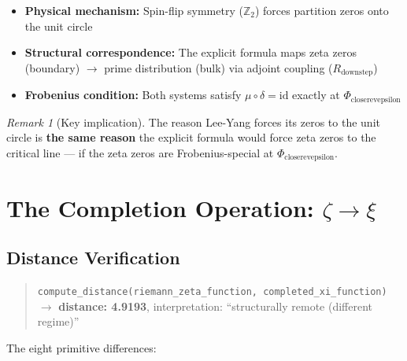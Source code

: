 \documentclass[12pt,oneside]{article}
\theoremstyle{definition}
\theoremstyle{remark}
\newtheorem{remark}[theorem]{Remark}
\newcommand{\Rdownstep}{R_{\text{downstep}}}
\newcommand{\Phicloserevepsilon}{\Phi_{\text{closerevepsilon}}}
\begin{document}
\begin{itemize}
\item \textbf{Physical mechanism:} Spin-flip symmetry ($\mathbb{Z}_2$) forces partition zeros onto the unit circle
\item \textbf{Structural correspondence:} The explicit formula maps zeta zeros (boundary) $\to$ prime distribution (bulk) via adjoint coupling ($\Rdownstep$)
\item \textbf{Frobenius condition:} Both systems satisfy $\mu \circ \delta = \text{id}$ exactly at $\Phicloserevepsilon$
\end{itemize}

\begin{remark}[Key implication]
The reason Lee-Yang forces its zeros to the unit circle is \textbf{the same reason} the explicit formula would force zeta zeros to the critical line --- if the zeta zeros are Frobenius-special at $\Phicloserevepsilon$.
\end{remark}

\section{The Completion Operation: $\zeta \to \xi$}

\subsection{Distance Verification}

\begin{quote}
\texttt{compute\_distance(riemann\_zeta\_function, completed\_xi\_function)}\\
$\to$ \textbf{distance: 4.9193}, interpretation: ``structurally remote (different regime)''
\end{quote}

The eight primitive differences:
\end{document}
